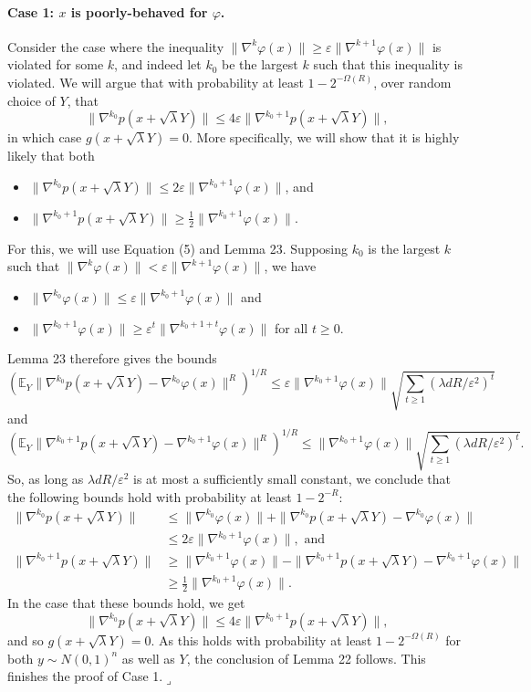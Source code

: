 \documentclass[10pt,a4paper]{article}
\begin{document}
\paragraph{Case 1: $x$ is poorly-behaved for $\varphi$.} Consider the case where the inequality $\|\nabla^k\varphi(x)\|\geq\varepsilon\|\nabla^{k+1}\varphi(x)\|$ is violated for some $k$, and indeed let $k_0$ be the largest $k$ such that this inequality is violated. We will argue that with probability at least $1-2^{-\Omega(R)}$, over random choice of $Y$, that
\[\|\nabla^{k_0}p(x+\sqrt\lambda Y)\|\leq4\varepsilon\|\nabla^{k_0+1}p(x+\sqrt\lambda Y)\|,\]
in which case $g(x+\sqrt\lambda Y)=0$.
More specifically, we will show that it is highly likely that both
\begin{itemize}
\item $\|\nabla^{k_0}p(x+\sqrt\lambda Y)\|\leq2\varepsilon\|\nabla^{k_0+1}\varphi(x)\|$, and
\item $\|\nabla^{k_0+1}p(x+\sqrt\lambda Y)\|\geq\frac12\|\nabla^{k_0+1}\varphi(x)\|$.
\end{itemize}
For this, we will use Equation (5) and Lemma 23. Supposing $k_0$ is the largest $k$ such that $\|\nabla^k\varphi(x)\|<\varepsilon\|\nabla^{k+1}\varphi(x)\|$, we have
\begin{itemize}
\item $\|\nabla^{k_0}\varphi(x)\|\leq\varepsilon\|\nabla^{k_0+1}\varphi(x)\|$ and
\item $\|\nabla^{k_0+1}\varphi(x)\|\geq\varepsilon^t\|\nabla^{k_0+1+t}\varphi(x)\|$ for all $t\geq0$.
\end{itemize}
Lemma 23 therefore gives the bounds
\[\left(\mathbb E_Y\|\nabla^{k_0}p(x+\sqrt\lambda Y)-\nabla^{k_0}\varphi(x)\|^R\right)^{1/R}\leq\varepsilon\|\nabla^{k_0+1}\varphi(x)\|\sqrt{\sum_{t\geq1}(\lambda dR/\varepsilon^2)^t}\]
and
\[\left(\mathbb E_Y\|\nabla^{k_0+1}p(x+\sqrt\lambda Y)-\nabla^{k_0+1}\varphi(x)\|^R\right)^{1/R}\leq\|\nabla^{k_0+1}\varphi(x)\|\sqrt{\sum_{t\geq1}(\lambda dR/\varepsilon^2)^t}.\]
So, as long as $\lambda dR/\varepsilon^2$ is at most a sufficiently small constant, we conclude that the following bounds hold with probability at least $1-2^{-R}$:
\begin{align*}
\|\nabla^{k_0}p(x+\sqrt\lambda Y)\|&\leq\|\nabla^{k_0}\varphi(x)\|+\|\nabla^{k_0}p(x+\sqrt\lambda Y)-\nabla^{k_0}\varphi(x)\|\\
&\leq2\varepsilon\|\nabla^{k_0+1}\varphi(x)\|,\text{ and}\\
\|\nabla^{k_0+1}p(x+\sqrt\lambda Y)\|&\geq\|\nabla^{k_0+1}\varphi(x)\|-\|\nabla^{k_0+1}p(x+\sqrt\lambda Y)-\nabla^{k_0+1}\varphi(x)\|\\
&\geq\tfrac12\|\nabla^{k_0+1}\varphi(x)\|.
\end{align*}
In the case that these bounds hold, we get
\[\|\nabla^{k_0}p(x+\sqrt\lambda Y)\|\leq4\varepsilon\|\nabla^{k_0+1}p(x+\sqrt\lambda Y)\|,\]
and so $g(x+\sqrt\lambda Y)=0$. As this holds with probability at least $1-2^{-\Omega(R)}$ for both $y\sim N(0,1)^n$ as well as $Y$, the conclusion of Lemma 22 follows. This finishes the proof of Case 1.\hfill$\lrcorner$
\end{document}
